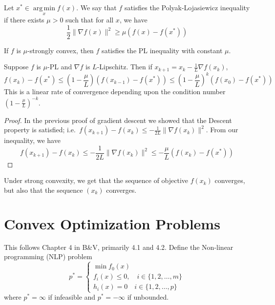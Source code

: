 \documentclass[english, 11pt]{article}
\DeclareMathOperator*{\argmin}{arg\,min}
\begin{document}
\begin{defn}
Let $x^* \in \argmin \limits_x f(x)$. We say that $f$ satisfies the Polyak-Lojasiewicz inequality if there exists $\mu>0$ such that for all $x$, we have
\[
\frac{1}{2} \| \nabla f(x) \|^2 \ge \mu (f(x) - f(x^*))
\]
\end{defn}

\begin{thrm}
If $f$ is $\mu$-strongly convex, then $f$ satisfies the PL inequality with constant $\mu$.
\end{thrm}

\begin{thrm}
Suppose $f$ is $\mu$-PL and $\nabla f$ is $L$-Lipschitz. Then if $x_{k+1} = x_k - \frac{1}{L} \nabla f(x_k)$, 
\[
f(x_k) - f(x^*) \le \left( 1 - \frac{\mu}{L} \right) \left( f(x_{k-1}) - f(x^*) \right)
\le \left( 1 - \frac{\mu}{L} \right)^k \left( f(x_0) - f(x^*) \right)
\]
This is a linear rate of convergence depending upon the condition number $\left( 1 - \frac{\mu}{L} \right)^{-k}$.
\end{thrm}
\begin{proof}
In the previous proof of gradient descent we showed that the Descent property is satisfied; i.e.\ $f(x_{k+1}) - f(x_k) \le - \frac{1}{2L} \| \nabla f(x_k)\|^2$. From our inequality, we have
\[
f(x_{k+1}) - f(x_k) \le - \frac{1}{2L} \| \nabla f(x_k)\|^2 \le - \frac{\mu}{L} ( f(x_k) - f(x^*)) \tag*{\qedhere}
\]
\end{proof}

\begin{rem}
Under strong convexity, we get that the sequence of objective $f(x_k)$ converges, but also that the sequence $(x_k)$ converges.
\end{rem}

\section{Convex Optimization Problems}
This follows Chapter 4 in B\&V, primarily 4.1 and 4.2. Define the Non-linear programming (NLP) problem
\[
p^* =\begin{cases} \min f_0(x)  \\
f_i(x) \le 0, \quad i \in \{1,2,\dots,m\} \\
h_i(x) =0 \quad i \in \{1,2,\dots,p\}
\end{cases}
\]
where $p^* = \infty$ if infeasible and $p^* = - \infty$ if unbounded.
\end{document}
